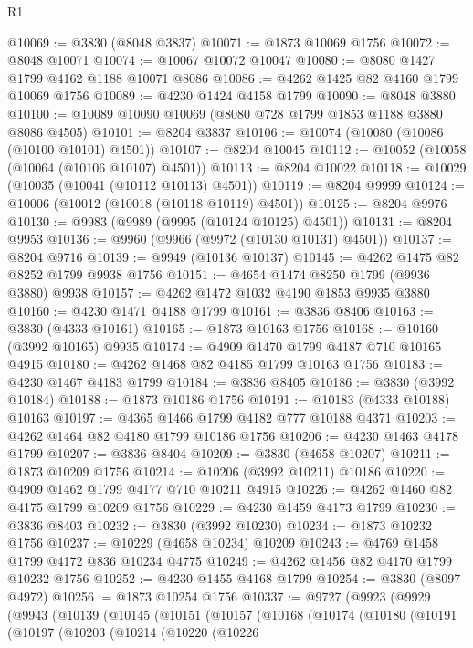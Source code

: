 \begin{lexlean}{R1}
\begin{coremodule}
@10069 := @3830 (@8048 @3837)
@10071 := @1873 @10069 @1756
@10072 := @8048 @10071
@10074 := @10067 @10072 @10047
@10080 := @8080 @1427 @1799 @4162 @1188 @10071 @8086
@10086 := @4262 @1425 @82 @4160 @1799 @10069 @1756
@10089 := @4230 @1424 @4158 @1799
@10090 := @8048 @3880
@10100 := @10089 @10090 @10069 (@8080 @728 @1799 @1853 @1188 @3880 @8086 @4505)
@10101 := @8204 @3837
@10106 := @10074 (@10080 (@10086 (@10100 @10101) @4501))
@10107 := @8204 @10045
@10112 := @10052 (@10058 (@10064 (@10106 @10107) @4501))
@10113 := @8204 @10022
@10118 := @10029 (@10035 (@10041 (@10112 @10113) @4501))
@10119 := @8204 @9999
@10124 := @10006 (@10012 (@10018 (@10118 @10119) @4501))
@10125 := @8204 @9976
@10130 := @9983 (@9989 (@9995 (@10124 @10125) @4501))
@10131 := @8204 @9953
@10136 := @9960 (@9966 (@9972 (@10130 @10131) @4501))
@10137 := @8204 @9716
@10139 := @9949 (@10136 @10137)
@10145 := @4262 @1475 @82 @8252 @1799 @9938 @1756
@10151 := @4654 @1474 @8250 @1799 (@9936 @3880) @9938
@10157 := @4262 @1472 @1032 @4190 @1853 @9935 @3880
@10160 := @4230 @1471 @4188 @1799
@10161 := @3836 @8406
@10163 := @3830 (@4333 @10161)
@10165 := @1873 @10163 @1756
@10168 := @10160 (@3992 @10165) @9935
@10174 := @4909 @1470 @1799 @4187 @710 @10165 @4915
@10180 := @4262 @1468 @82 @4185 @1799 @10163 @1756
@10183 := @4230 @1467 @4183 @1799
@10184 := @3836 @8405
@10186 := @3830 (@3992 @10184)
@10188 := @1873 @10186 @1756
@10191 := @10183 (@4333 @10188) @10163
@10197 := @4365 @1466 @1799 @4182 @777 @10188 @4371
@10203 := @4262 @1464 @82 @4180 @1799 @10186 @1756
@10206 := @4230 @1463 @4178 @1799
@10207 := @3836 @8404
@10209 := @3830 (@4658 @10207)
@10211 := @1873 @10209 @1756
@10214 := @10206 (@3992 @10211) @10186
@10220 := @4909 @1462 @1799 @4177 @710 @10211 @4915
@10226 := @4262 @1460 @82 @4175 @1799 @10209 @1756
@10229 := @4230 @1459 @4173 @1799
@10230 := @3836 @8403
@10232 := @3830 (@3992 @10230)
@10234 := @1873 @10232 @1756
@10237 := @10229 (@4658 @10234) @10209
@10243 := @4769 @1458 @1799 @4172 @836 @10234 @4775
@10249 := @4262 @1456 @82 @4170 @1799 @10232 @1756
@10252 := @4230 @1455 @4168 @1799
@10254 := @3830 (@8097 @4972)
@10256 := @1873 @10254 @1756
@10337 := @9727
    (@9923
      (@9929
        (@9943
          (@10139
            (@10145
              (@10151
                (@10157
                  (@10168
                    (@10174
                      (@10180
                        (@10191
                          (@10197
                            (@10203
                              (@10214
                                (@10220
                                  (@10226

\end{coremodule}
\end{lexlean}
